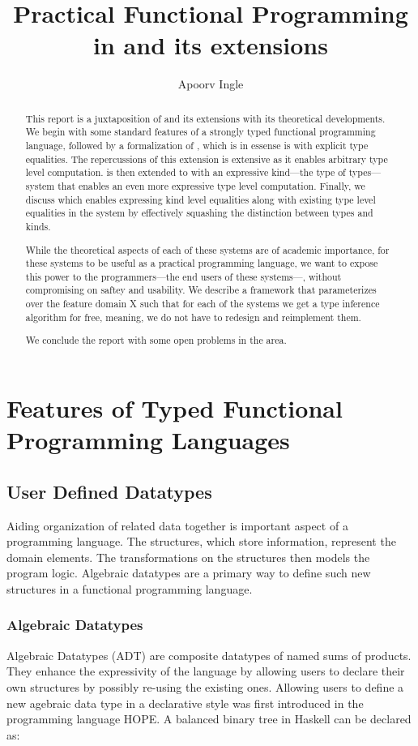 \documentclass[manuscript,screen,nonacm]{acmart}
\title{Practical Functional Programming in \SFC and its extensions}
\author{Apoorv Ingle}
\affiliation{%
  \institution{University of Iowa}
  \department{Department of Computer Science}
  \streetaddress{McLean Hall}
  \city{Iowa City}
  \state{Iowa}
  \country{USA}}
\begin{document}
\begin{abstract}
  This report is a juxtaposition of \SFC and its extensions with its theoretical developments. We begin with some standard features of a strongly typed functional programming language, followed by a formalization of \SFC, which is in essense is \SF with explicit type equalities. The repercussions of this extension is extensive as it enables arbitrary type level computation. \SFC is then extended to \SFP with an expressive kind---the type of types---system that enables an even more expressive type level computation. Finally, we discuss \SFK which enables expressing kind level equalities along with existing type level equalities in the system by effectively squashing the distinction between types and kinds.

  While the theoretical aspects of each of these systems are of academic importance, for these systems to be useful as a practical programming language, we want to expose this power to the programmers---the end users of these systems---, without compromising on saftey and usability. We describe a framework \HMX that parameterizes over the feature domain X such that for each of the systems we get a type inference algorithm for free, meaning, we do not have to redesign and reimplement them.

  We conclude the report with some open problems in the area.
\end{abstract}

\maketitle
\pagestyle{plain}

\section{Features of Typed Functional Programming Languages}\label{sec:language-features}
\subsection{User Defined Datatypes}
Aiding organization of related data together is important aspect of a programming language. The structures, which store information, represent the domain elements. The transformations on the structures then models the program logic. Algebraic datatypes are a primary way to define such new structures in a functional programming language.

\subsubsection{Algebraic Datatypes}
Algebraic Datatypes (ADT) are composite datatypes of named sums of products. They enhance the expressivity of the language by allowing users to declare their own structures by possibly re-using the existing ones. Allowing users to define a new agebraic data type in a declarative style was first introduced in the programming language HOPE\cite{burstall_hope_1980}. A balanced binary tree in Haskell can be declared as:
\end{document}
